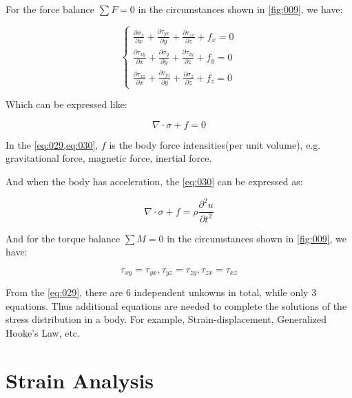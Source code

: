 \documentclass[en,hazy,cyan,8pt,normal]{elegantnote}
\numberwithin{equation}{section}
\begin{document}
    For the force balance $\sum F=0$ in the circumstances shown in \cref{fig:009}, we have:

    \begin{equation}\label{eq:029}
      \left\{
      \begin{aligned}
        \displaystyle \frac{\partial\sigma_x}{\partial x}+\frac{\partial\tau_{yx}}{\partial y}+\frac{\partial\tau_{zx}}{\partial z}+f_x=0 \\
        \displaystyle \frac{\partial\tau_{xy}}{\partial x}+\frac{\partial\sigma_y}{\partial y}+\frac{\partial\tau_{zy}}{\partial z}+f_y=0 \\
        \displaystyle \frac{\partial\tau_{xz}}{\partial x}+\frac{\partial\tau_{yz}}{\partial y}+\frac{\partial\sigma_z}{\partial z}+f_z=0
      \end{aligned}
      \right.
    \end{equation}

    Which can be expressed like:

    \begin{equation}\label{eq:030}
      \nabla \cdot \sigma + f = 0
    \end{equation}

    In the \cref{eq:029,eq:030}, $f$ is the body force intensities(per unit volume), e.g. gravitational force, magnetic force, inertial force.

    And when the body has acceleration, the \cref{eq:030} can be expressed as:

    \begin{equation}\label{eq:031}
      \nabla \cdot \sigma + f = \rho \frac{\partial^2 u}{\partial t^2}
    \end{equation}

    And for the torque balance $\sum M=0$ in the circumstances shown in \cref{fig:009}, we have:

    \begin{equation}\label{eq:032}
        \tau_{xy}=\tau_{yx}, \tau_{yz}=\tau_{zy}, \tau_{zx}=\tau_{xz}
    \end{equation}

    From the \cref{eq:029}, there are 6 independent unkowns in total, while only 3 equations. Thus additional equations are needed to complete the solutions of the stress distribution in a body. For example, Strain-displacement, Generalized Hooke's Law, etc.

\section{Strain Analysis}\label{sec:02}
\end{document}
